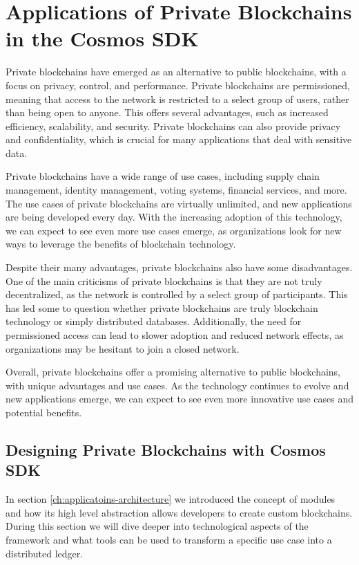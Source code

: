 \chapter{Applications of Private Blockchains in the Cosmos SDK}
\label{ch:private}

Private blockchains have emerged as an alternative to public blockchains, with a focus on privacy, control, and performance. Private blockchains are permissioned, meaning that access to the network is restricted to a select group of users, rather than being open to anyone. This offers several advantages, such as increased efficiency, scalability, and security. Private blockchains can also provide privacy and confidentiality, which is crucial for many applications that deal with sensitive data.

Private blockchains have a wide range of use cases, including supply chain management, identity management, voting systems, financial services, and more. The use cases of private blockchains are virtually unlimited, and new applications are being developed every day. With the increasing adoption of this technology, we can expect to see even more use cases emerge, as organizations look for new ways to leverage the benefits of blockchain technology.

Despite their many advantages, private blockchains also have some disadvantages. One of the main criticisms of private blockchains is that they are not truly decentralized, as the network is controlled by a select group of participants. This has led some to question whether private blockchains are truly blockchain technology or simply distributed databases. Additionally, the need for permissioned access can lead to slower adoption and reduced network effects, as organizations may be hesitant to join a closed network.

Overall, private blockchains offer a promising alternative to public blockchains, with unique advantages and use cases. As the technology continues to evolve and new applications emerge, we can expect to see even more innovative use cases and potential benefits.

\section{Designing Private Blockchains with Cosmos SDK}

In section \ref{ch:applicatoins-architecture} we introduced the concept of modules and how its high level abstraction allows developers to create custom blockchains. During this section we will dive deeper into technological aspects of the framework and what tools can be used to transform a specific use case into a distributed ledger.

